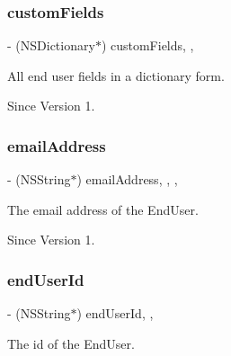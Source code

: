 \subsubsection{\texorpdfstring{custom\+Fields}{customFields}}
{\footnotesize\ttfamily -\/ (N\+S\+Dictionary$\ast$) custom\+Fields\hspace{0.3cm}{\ttfamily [read]}, {\ttfamily [nonatomic]}, {\ttfamily [assign]}}



All end user fields in a dictionary form. 

\begin{DoxySince}{Since}
Version 1. 
\end{DoxySince}
\hypertarget{class_x_i_end_user_info_a31c9f74ef89bb72c2681f2d023584766}{}\label{class_x_i_end_user_info_a31c9f74ef89bb72c2681f2d023584766} 
\subsubsection{\texorpdfstring{email\+Address}{emailAddress}}
{\footnotesize\ttfamily -\/ (N\+S\+String$\ast$) email\+Address\hspace{0.3cm}{\ttfamily [read]}, {\ttfamily [write]}, {\ttfamily [nonatomic]}, {\ttfamily [assign]}}



The email address of the End\+User. 

\begin{DoxySince}{Since}
Version 1. 
\end{DoxySince}
\hypertarget{class_x_i_end_user_info_a40a558596a4e490f4529328dc1a03749}{}\label{class_x_i_end_user_info_a40a558596a4e490f4529328dc1a03749} 
\subsubsection{\texorpdfstring{end\+User\+Id}{endUserId}}
{\footnotesize\ttfamily -\/ (N\+S\+String$\ast$) end\+User\+Id\hspace{0.3cm}{\ttfamily [read]}, {\ttfamily [nonatomic]}, {\ttfamily [assign]}}



The id of the End\+User. 

